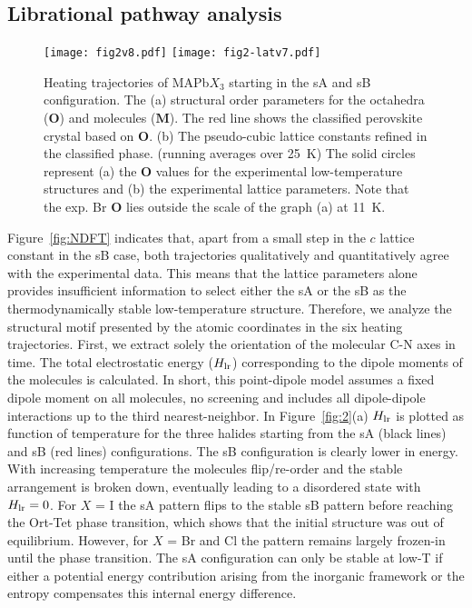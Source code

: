 \documentclass[journal=jpccck,manuscript=article,layout=twocolumn]{achemso}
\begin{document}
\subsection{Librational pathway analysis}

\begin{figure*}[!t]
    \begin{center}
    \texttt{[image: fig2v8.pdf]}
    \texttt{[image: fig2-latv7.pdf]}
    \end{center}
   \caption{Heating trajectories of MAPb$X_3$ starting in the sA and sB configuration. The (a) structural order parameters for the octahedra ($\mathbf{O}$) and molecules ($\mathbf{M}$). The red line shows the classified perovskite crystal based on $\mathbf{O}$. (b) The pseudo-cubic lattice constants refined in the classified phase. (running averages over 25~K) The solid circles represent (a) the $\mathbf{O}$ values for the experimental low-temperature structures\cite{Baikie:jmca:13,Swainson:jssc03,Chi:jssc05} and (b) the experimental lattice parameters\cite{Whitfield:sr16,Swainson:jssc03,Chi:jssc05}. Note that the exp. Br $\mathbf{O}$ lies outside the scale of the graph (a) at 11~K.}
\label{fig:3}
\end{figure*}

Figure~\ref{fig:NDFT} indicates that, apart from a small step in the $c$ lattice constant in the sB case, both trajectories qualitatively and quantitatively agree with the experimental data. This means that the lattice parameters alone provides insufficient information to select either the sA or the sB as the thermodynamically stable low-temperature structure. Therefore, we analyze the structural motif presented by the atomic coordinates in the six heating trajectories. First, we extract solely the orientation of the molecular C-N axes in time. The total electrostatic energy ($H_{\rm lr}$) corresponding to the dipole moments of the molecules is calculated\cite{Lahnsteiner:prb19}. In short, this point-dipole model assumes a fixed dipole moment on all molecules, no screening and includes all dipole-dipole interactions up to the third nearest-neighbor. In Figure~\ref{fig:2}(a) $H_{\rm lr}$ is plotted as function of temperature for the three halides starting from the sA (black lines) and sB (red lines) configurations. The sB configuration is clearly lower in energy. With increasing temperature the molecules flip/re-order and the stable arrangement is broken down, eventually leading to a disordered state with $H_{\rm lr}=0$\cite{Govinda:jpcl17}. For $X$ = I the sA pattern flips to the stable sB pattern before reaching the Ort-Tet phase transition, which shows that the initial structure was out of equilibrium. However, for $X$ = Br and Cl the pattern remains largely frozen-in until the phase transition. The sA configuration can only be stable at low-T if either a potential energy contribution arising from the inorganic framework or the entropy compensates this internal energy difference.
\end{document}
